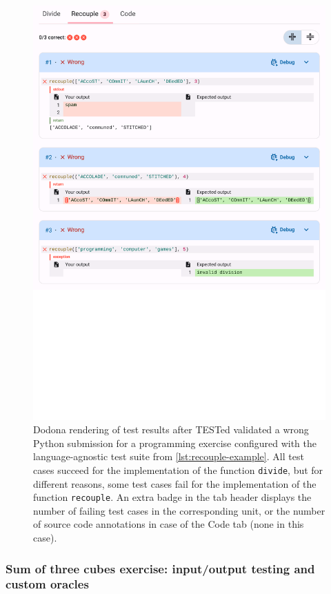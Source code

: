 \documentclass[../main]{subfiles}
\begin{document}
\begin{figure}
    \centering
    \includegraphics[width=\textwidth]{render-recouple}
    \caption{
        Dodona rendering of test results after TESTed validated a wrong Python submission for a programming exercise configured with the language-agnostic test suite from \cref{lst:recouple-example}.
        All test cases succeed for the implementation of the function \texttt{divide}, but for different reasons, some test cases fail for the implementation of the function \texttt{recouple}.
        An extra badge in the tab header displays the number of failing test cases in the corresponding unit, or the number of source code annotations in case of the Code tab (none in this case).
    }
    \label{fig:dodona-render-recouple}
\end{figure}

\subsubsection{Sum of three cubes exercise: input/output testing and custom oracles}\label{subsubsec:sum-of-three-cubes-exercise:-i/o-stream-testing-and-custom-oracles}
\end{document}
